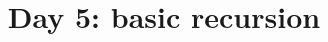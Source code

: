 \documentclass{article}
\begin{document}
\title{Day 5: basic recursion}
\date{}
\maketitle


\end{document}
